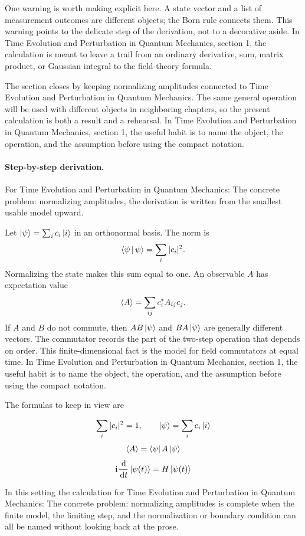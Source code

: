 One warning is worth making explicit here.  A state vector and a list of measurement outcomes are different objects; the Born rule connects them.  This warning points to the delicate step of the derivation, not to a decorative aside.  In Time Evolution and Perturbation in Quantum Mechanics, section 1, the calculation is meant to leave a trail from an ordinary derivative, sum, matrix product, or Gaussian integral to the field-theory formula.

The section closes by keeping normalizing amplitudes connected to Time Evolution and Perturbation in Quantum Mechanics.  The same general operation will be used with different objects in neighboring chapters, so the present calculation is both a result and a rehearsal.  In Time Evolution and Perturbation in Quantum Mechanics, section 1, the useful habit is to name the object, the operation, and the assumption before using the compact notation.



\paragraph{Step-by-step derivation.}

For Time Evolution and Perturbation in Quantum Mechanics: The concrete problem: normalizing amplitudes, the derivation is written from the smallest usable model upward.

Let \(\left|\psi\right\rangle=\sum_i c_i\left|i\right\rangle\) in an orthonormal basis.  The norm is
\[
  \left\langle \psi\,\middle|\,\psi\right\rangle=\sum_i |c_i|^2.
\]
Normalizing the state makes this sum equal to one.  An observable \(A\) has expectation value
\[
  \left\langle A\right\rangle=\sum_{ij}c_i^*A_{ij}c_j.
\]
If \(A\) and \(B\) do not commute, then \(AB\left|\psi\right\rangle\) and \(BA\left|\psi\right\rangle\) are generally different vectors.  The commutator records the part of the two-step operation that depends on order.  This finite-dimensional fact is the model for field commutators at equal time.  In Time Evolution and Perturbation in Quantum Mechanics, section 1, the useful habit is to name the object, the operation, and the assumption before using the compact notation.

The formulas to keep in view are

\[
  \sum_i |c_i|^2=1,\qquad \left|\psi\right\rangle=\sum_i c_i\left|i\right\rangle
\]
\[
  \left\langle A\right\rangle=\left\langle \psi\right|A\left|\psi\right\rangle
\]
\[
  \mathrm i\frac{\,\mathrm d}{\,\mathrm d t}\left|\psi(t)\right\rangle=H\left|\psi(t)\right\rangle
\]

In this setting the calculation for Time Evolution and Perturbation in Quantum Mechanics: The concrete problem: normalizing amplitudes is complete when the finite model, the limiting step, and the normalization or boundary condition can all be named without looking back at the prose.




